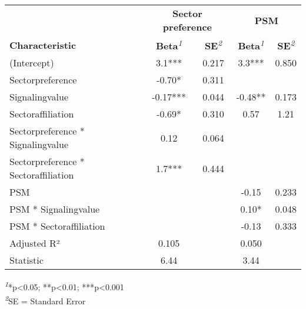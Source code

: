 \setlength{\LTpost}{0mm}
\begin{longtable}{lcccc}
\toprule
 & \multicolumn{2}{c}{\textbf{Sector preference}} & \multicolumn{2}{c}{\textbf{PSM}} \\ 
\cmidrule(lr){2-3} \cmidrule(lr){4-5}
\textbf{Characteristic} & \textbf{Beta}\textsuperscript{\textit{1}} & \textbf{SE}\textsuperscript{\textit{2}} & \textbf{Beta}\textsuperscript{\textit{1}} & \textbf{SE}\textsuperscript{\textit{2}} \\ 
\midrule\addlinespace[2.5pt]
(Intercept) & 3.1*** & 0.217 & 3.3*** & 0.850 \\ 
Sectorpreference & -0.70* & 0.311 &  &  \\ 
Signalingvalue & -0.17*** & 0.044 & -0.48** & 0.173 \\ 
Sectoraffiliation & -0.69* & 0.310 & 0.57 & 1.21 \\ 
Sectorpreference * Signalingvalue & 0.12 & 0.064 &  &  \\ 
Sectorpreference * Sectoraffiliation & 1.7*** & 0.444 &  &  \\ 
PSM &  &  & -0.15 & 0.233 \\ 
PSM * Signalingvalue &  &  & 0.10* & 0.048 \\ 
PSM * Sectoraffiliation &  &  & -0.13 & 0.333 \\ 
Adjusted R² & 0.105 &  & 0.050 &  \\ 
Statistic & 6.44 &  & 3.44 &  \\ 
\bottomrule
\end{longtable}
\begin{minipage}{\linewidth}
\textsuperscript{\textit{1}}*p\textless{}0.05; **p\textless{}0.01; ***p\textless{}0.001\\
\textsuperscript{\textit{2}}SE = Standard Error\\
\end{minipage}

